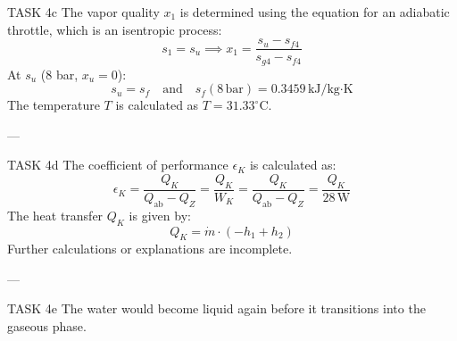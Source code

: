 TASK 4c  
The vapor quality \( x_1 \) is determined using the equation for an adiabatic throttle, which is an isentropic process:  
\[
s_1 = s_u \implies x_1 = \frac{s_u - s_{f4}}{s_{g4} - s_{f4}}
\]  
At \( s_u \) (8 bar, \( x_u = 0 \)):  
\[
s_u = s_f \quad \text{and} \quad s_f (8 \, \text{bar}) = 0.3459 \, \text{kJ/kg·K}
\]  
The temperature \( T \) is calculated as \( T = 31.33^\circ\text{C} \).

---

TASK 4d  
The coefficient of performance \( \epsilon_K \) is calculated as:  
\[
\epsilon_K = \frac{Q_K}{Q_{\text{ab}} - Q_Z} = \frac{Q_K}{W_K} = \frac{Q_K}{Q_{\text{ab}} - Q_Z} = \frac{Q_K}{28 \, \text{W}}
\]  
The heat transfer \( Q_K \) is given by:  
\[
Q_K = \dot{m} \cdot (-h_1 + h_2)
\]  
Further calculations or explanations are incomplete.

---

TASK 4e  
The water would become liquid again before it transitions into the gaseous phase.